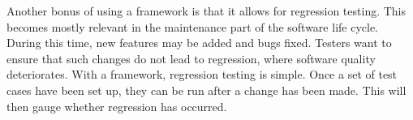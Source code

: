 Another bonus of using a framework is that it allows for regression testing. This becomes mostly relevant in the maintenance part of the software life cycle. During this time, new features may be added and bugs fixed. Testers want to ensure that such changes do not lead to regression,  where software quality deteriorates. With a framework, regression testing is simple. Once a set of test cases have been set up, they can be run after a change has been made. This will then gauge whether regression has occurred.



